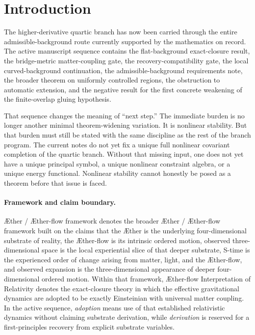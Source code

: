 \documentclass[11pt]{article}
\newcommand{\Aether}{\AE{}ther}
\newcommand{\Aflow}{\AE{}ther-flow}
\newcommand{\TheoryName}{\Aflow{} Interpretation of Relativity}
\newcommand{\TheoryProgram}{\Aether{} / \Aflow{} framework}
\begin{document}
\section{Introduction}

The higher-derivative quartic branch has now been carried through the entire admissible-background route currently supported by the mathematics on record. The active manuscript sequence contains the flat-background exact-closure result, the bridge-metric matter-coupling gate, the recovery-compatibility gate, the local curved-background continuation, the admissible-background requirements note, the broader theorem on uniformly controlled regions, the obstruction to automatic extension, and the negative result for the first concrete weakening of the finite-overlap gluing hypothesis.

That sequence changes the meaning of ``next step.'' The immediate burden is no longer another minimal theorem-widening variation. It is nonlinear stability. But that burden must still be stated with the same discipline as the rest of the branch program. The current notes do not yet fix a unique full nonlinear covariant completion of the quartic branch. Without that missing input, one does not yet have a unique principal symbol, a unique nonlinear constraint algebra, or a unique energy functional. Nonlinear stability cannot honestly be posed as a theorem before that issue is faced.

\paragraph{Framework and claim boundary.}
\TheoryProgram{} denotes the broader \Aether{} / \Aflow{} framework built on the claims that the \Aether{} is the underlying four-dimensional substrate of reality, the \Aflow{} is its intrinsic ordered motion, observed three-dimensional space is the local experiential slice of that deeper substrate, S-time is the experienced order of change arising from matter, light, and the \Aflow{}, and observed expansion is the three-dimensional appearance of deeper four-dimensional ordered motion. Within that framework, \TheoryName{} denotes the exact-closure theory in which the effective gravitational dynamics are adopted to be exactly Einsteinian with universal matter coupling. In the active sequence, \emph{adoption} means use of that established relativistic dynamics without claiming substrate derivation, while \emph{derivation} is reserved for a first-principles recovery from explicit substrate variables.
\end{document}
